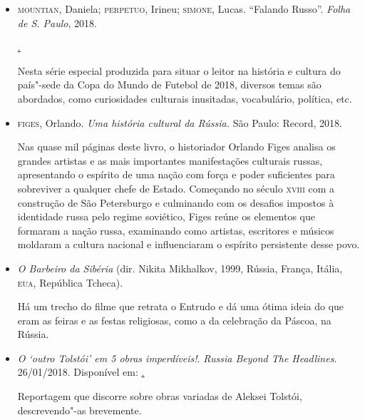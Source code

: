 \documentclass[11pt]{extarticle}
\begin{document}
\begin{itemize}
\item\textsc{mountian}, Daniela; \textsc{perpetuo}, Irineu; \textsc{simone}, Lucas. ``Falando Russo''. \emph{Folha de S. Paulo}, 2018.

\href{https://www1.folha.uol.com.br/especial/2018/falando-russo/\#20}.


Nesta série especial produzida para situar o leitor na história e
cultura do país"-sede da Copa do Mundo de Futebol de 2018, diversos temas
são abordados, como curiosidades culturais inusitadas, vocabulário,
política, etc.

\item\textsc{figes}, Orlando. \emph{Uma história cultural da Rússia.} São Paulo:
Record, 2018. 

Nas quase mil páginas deste livro, o historiador
Orlando Figes analisa os grandes artistas e as mais importantes
manifestações culturais russas, apresentando o espírito de uma nação com
força e poder suficientes para sobreviver a qualquer chefe de Estado.
Começando no século \textsc{xviii} com a construção de São Petersburgo e
culminando com os desafios impostos à identidade russa pelo regime
soviético, Figes reúne os elementos que formaram a nação russa,
examinando como artistas, escritores e músicos moldaram a cultura
nacional e influenciaram o espírito persistente desse povo.

\item\emph{O Barbeiro da Sibéria} (dir. Nikita Mikhalkov, 1999, Rússia,
França, Itália, \textsc{eua}, República Tcheca).

Há um trecho do filme que
retrata o Entrudo e dá uma ótima ideia do que eram as feiras e as festas
religiosas, como a da celebração da Páscoa, na Rússia.

\item\emph{O `outro Tolstói' em 5 obras imperdíveis!}. \emph{Russia Beyond
The Headlines}. 26/01/2018. Disponível em:
\href{https://br.rbth.com/cultura/79816-o-outro-tolstoi-em-5-obras}.


Reportagem que discorre sobre obras variadas de Aleksei Tolstói,
descrevendo"-as brevemente.


\end{itemize}
\end{document}
